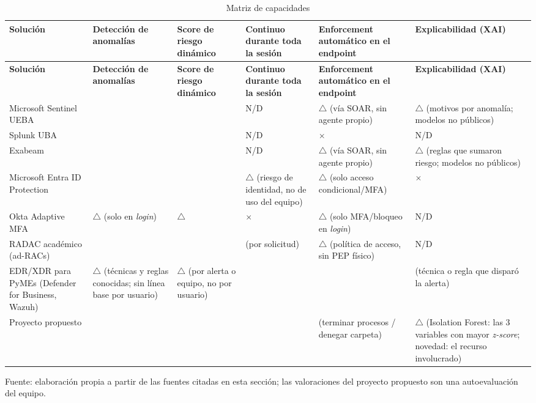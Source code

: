 \begin{longtable}{p{2.5cm}p{1.8cm}p{1.8cm}p{2.0cm}p{2.4cm}p{2.8cm}}
	\caption{Matriz de capacidades}
	\label{tab:matriz-capacidades}\\
	\hline
	\textbf{Solución} & \textbf{Detección de anomalías} & \textbf{Score de riesgo dinámico} & \textbf{Continuo durante toda la sesión} & \textbf{Enforcement automático en el endpoint} & \textbf{Explicabilidad (XAI)} \\
	\hline
	\endfirsthead
	\hline
	\textbf{Solución} & \textbf{Detección de anomalías} & \textbf{Score de riesgo dinámico} & \textbf{Continuo durante toda la sesión} & \textbf{Enforcement automático en el endpoint} & \textbf{Explicabilidad (XAI)} \\
	\hline
	\endhead
	Microsoft Sentinel UEBA & \checkmark & \checkmark & N/D & $\bigtriangleup$ (vía SOAR, sin agente propio) & $\bigtriangleup$ (motivos por anomalía; modelos no públicos) \\
	\hline
	Splunk UBA & \checkmark & \checkmark & N/D & $\times$ & N/D \\
	\hline
	Exabeam & \checkmark & \checkmark & N/D & $\bigtriangleup$ (vía SOAR, sin agente propio) & $\bigtriangleup$ (reglas que sumaron riesgo; modelos no públicos) \\
	\hline
	Microsoft Entra ID Protection & \checkmark & \checkmark & $\bigtriangleup$ (riesgo de identidad, no de uso del equipo) & $\bigtriangleup$ (solo acceso condicional/MFA) & $\times$ \\
	\hline
	Okta Adaptive MFA & $\bigtriangleup$ (solo en \emph{login}) & $\bigtriangleup$ & $\times$ & $\bigtriangleup$ (solo MFA/bloqueo en \emph{login}) & N/D \\
	\hline
	RADAC académico (ad-RACs) & \checkmark & \checkmark & \checkmark (por solicitud) & $\bigtriangleup$ (política de acceso, sin PEP físico) & N/D \\
	\hline
	EDR/XDR para PyMEs (Defender for Business, Wazuh) & $\bigtriangleup$ (técnicas y reglas conocidas; sin línea base por usuario) & $\bigtriangleup$ (por alerta o equipo, no por usuario) & \checkmark & \checkmark & \checkmark (técnica o regla que disparó la alerta) \\
	\hline
	Proyecto propuesto & \checkmark & \checkmark & \checkmark & \checkmark (terminar procesos / denegar carpeta) & $\bigtriangleup$ (Isolation Forest: las 3 variables con mayor \emph{z-score}; novedad: el recurso involucrado) \\
	\hline
\end{longtable}
{\small Fuente: elaboración propia a partir de las fuentes citadas en esta sección; las valoraciones del proyecto propuesto son una autoevaluación del equipo.\par}

